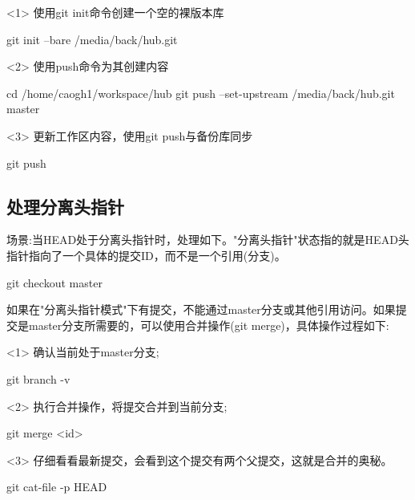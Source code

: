 \documentclass{article}
\begin{document}
<1> 使用git init命令创建一个空的裸版本库
\begin{cppcode}
       git init --bare /media/back/hub.git
\end{cppcode}

<2> 使用push命令为其创建内容
\begin{cppcode}
       cd /home/caogh1/workspace/hub
       git push --set-upstream /media/back/hub.git master
\end{cppcode}

<3> 更新工作区内容，使用git push与备份库同步
\begin{cppcode}
       git push
\end{cppcode}

\subsection{处理分离头指针}
场景:当HEAD处于分离头指针时，处理如下。"分离头指针"状态指的就是HEAD头指针指向了一个具体的提交ID，而不是一个引用(分支)。

git checkout master

如果在"分离头指针模式"下有提交，不能通过master分支或其他引用访问。如果提交是master分支所需要的，可以使用合并操作(git merge)，具体操作过程如下:

<1> 确认当前处于master分支;

\begin{cppcode}
      git branch -v
\end{cppcode}

<2> 执行合并操作，将提交合并到当前分支;

\begin{cppcode}
     git merge <id>
\end{cppcode}

<3> 仔细看看最新提交，会看到这个提交有两个父提交，这就是合并的奥秘。

\begin{cppcode}
     git cat-file -p HEAD
\end{cppcode}
\end{document}
